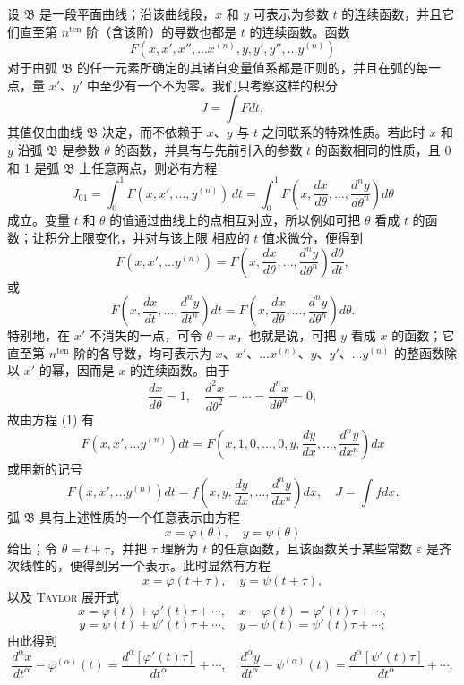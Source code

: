 \documentclass[11pt,a4paper,leqno]{article}
\begin{document}
设 $\mathfrak B$ 是一段平面曲线；沿该曲线段，$x$ 和 $y$ 可表示为参数 $t$ 的连续函数，并且它们直至第 $n^{\mathrm{ten}}$ 阶（含该阶）的导数也都是 $t$ 的连续函数。函数
\[
F(x,x',x'',\ldots x^{(n)},y,y',y'',\ldots y^{(n)})
\]
对于由弧 $\mathfrak B$ 的任一元素所确定的其诸自变量值系都是正则的，并且在弧的每一点，量 $x'$、$y'$ 中至少有一个不为零。我们只考察这样的积分
\[
J=\int Fdt,
\]
其值仅由曲线 $\mathfrak B$ 决定，而不依赖于 $x$、$y$ 与 $t$ 之间联系的特殊性质。若此时 $x$ 和 $y$ 沿弧 $\mathfrak B$ 是参数 $\theta$ 的函数，并具有与先前引入的参数 $t$ 的函数相同的性质，且 0 和 1 是弧 $\mathfrak B$ 上任意两点，则必有方程
\[
J_{01}=\int_0^1 F(x,x',\ldots,y^{(n)})\,dt
=\int_0^1 F\left(x,\frac{dx}{d\theta},\ldots,\frac{d^ny}{d\theta^n}\right)d\theta
\]
成立。变量 $t$ 和 $\theta$ 的值通过曲线上的点相互对应，所以例如可把 $\theta$ 看成 $t$ 的函数；让积分上限变化，并对与该上限
相应的 $t$ 值求微分，便得到
\[
F(x,x',\ldots y^{(n)})
=F\left(x,\frac{dx}{d\theta},\ldots,\frac{d^ny}{d\theta^n}\right)\frac{d\theta}{dt},
\]
或
\begin{equation}\tag{1}
F\left(x,\frac{dx}{dt},\ldots,\frac{d^ny}{dt^n}\right)dt
=F\left(x,\frac{dx}{d\theta},\ldots,\frac{d^ny}{d\theta^n}\right)d\theta.
\end{equation}
特别地，在 $x'$ 不消失的一点，可令 $\theta=x$，也就是说，可把 $y$ 看成 $x$ 的函数；它直至第 $n^{\mathrm{ten}}$ 阶的各导数，均可表示为 $x$、$x'$、$\ldots x^{(n)}$、$y$、$y'$、$\ldots y^{(n)}$ 的整函数除以 $x'$ 的幂，因而是 $x$ 的连续函数。由于
\[
\frac{dx}{d\theta}=1,
\quad
\frac{d^2x}{d\theta^2}=\cdots=\frac{d^nx}{d\theta^n}=0,
\]
故由方程 (1) 有
\[
F(x,x',\ldots y^{(n)})dt
=F\left(x,1,0,\ldots,0,y,\frac{dy}{dx},\ldots,\frac{d^ny}{dx^n}\right)dx
\]
或用新的记号
\[
F(x,x',\ldots y^{(n)})dt
=f\left(x,y,\frac{dy}{dx},\ldots,\frac{d^ny}{dx^n}\right)dx,
\quad J=\int fdx.
\]
弧 $\mathfrak B$ 具有上述性质的一个任意表示由方程
\begin{equation}\tag{2}
x=\varphi(\theta),\quad y=\psi(\theta)
\end{equation}
给出；令 $\theta=t+\tau$，并把 $\tau$ 理解为 $t$ 的任意函数，且该函数关于某些常数 $\varepsilon$ 是齐次线性的，便得到另一个表示。此时显然有方程
\[
x=\varphi(t+\tau),\quad y=\psi(t+\tau),
\]
以及 \textsc{Taylor} 展开式
\[
x=\varphi(t)+\varphi'(t)\tau+\cdots,
\quad x-\varphi(t)=\varphi'(t)\tau+\cdots,
\]
\[
y=\psi(t)+\psi'(t)\tau+\cdots,
\quad y-\psi(t)=\psi'(t)\tau+\cdots;
\]
由此得到
\[
\frac{d^\alpha x}{dt^\alpha}-\varphi^{(\alpha)}(t)
=\frac{d^\alpha[\varphi'(t)\tau]}{dt^\alpha}+\cdots,
\quad
\frac{d^\alpha y}{dt^\alpha}-\psi^{(\alpha)}(t)
=\frac{d^\alpha[\psi'(t)\tau]}{dt^\alpha}+\cdots,
\]
\end{document}
